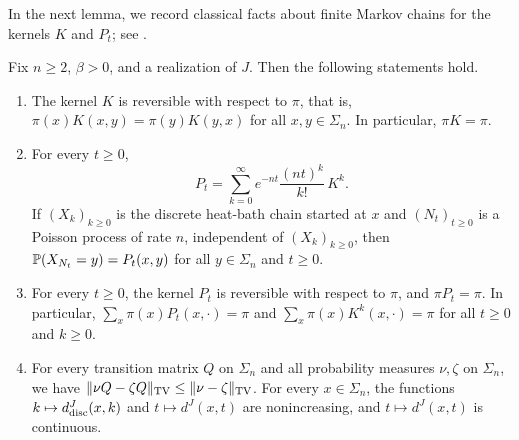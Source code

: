 In the next lemma, we record classical facts about finite Markov chains for the kernels $K$ and $P_t$; see \cite[Proposition~1.20, Exercise~4.2, and Section~20.1]{levin-peres-2017}.

\begin{lemma}\label{lem:model-dynamics}
Fix $n\ge2$, $\beta>0$, and a realization of $J$. Then the following statements hold.
\begin{enumerate}[label=(\alph*)]
\item The kernel $K$ is reversible with respect to $\pi$, that is, $\pi(x)K(x,y)=\pi(y)K(y,x)$ for all $x,y\in\Sigma_n$. In particular, $\pi K=\pi$.
\item For every $t\ge0$,
\begin{equation}\label{eq:model-poisson}
 P_t=\sum_{k=0}^\infty e^{-nt}\frac{(nt)^k}{k!}\,K^k.
\end{equation}
If $(X_k)_{k\ge0}$ is the discrete heat-bath chain started at $x$ and $(N_t)_{t\ge0}$ is a Poisson process of rate $n$, independent of $(X_k)_{k\ge0}$, then $\mathbb P(X_{N_t}=y)=P_t(x,y)$ for all $y\in\Sigma_n$ and $t\ge0$.
\item For every $t\ge0$, the kernel $P_t$ is reversible with respect to $\pi$, and $\pi P_t=\pi$. In particular, $\sum_x\pi(x)P_t(x,\cdot)=\pi$ and $\sum_x\pi(x)K^k(x,\cdot)=\pi$ for all $t\ge0$ and $k\ge0$.
\item For every transition matrix $Q$ on $\Sigma_n$ and all probability measures $\nu,\zeta$ on $\Sigma_n$, we have $\lVert \nu Q-\zeta Q\rVert_{\mathrm{TV}}\le\lVert \nu-\zeta\rVert_{\mathrm{TV}}$. For every $x\in\Sigma_n$, the functions $k\mapsto d^J_{\rm disc}(x,k)$ and $t\mapsto d^J(x,t)$ are nonincreasing, and $t\mapsto d^J(x,t)$ is continuous.
\end{enumerate}
\end{lemma}

